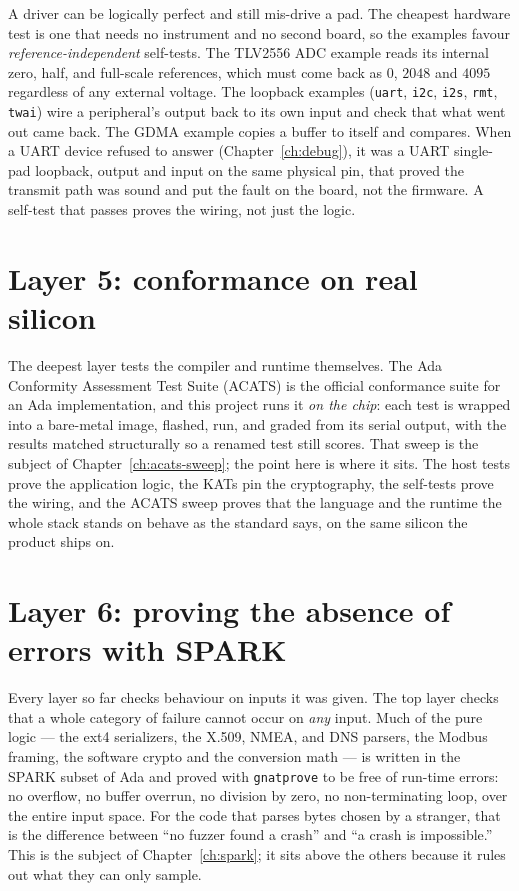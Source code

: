 A driver can be logically perfect and still mis-drive a pad. The cheapest hardware
test is one that needs no instrument and no second board, so the examples favour
\emph{reference-independent} self-tests. The TLV2556 ADC example reads its internal
zero, half, and full-scale references, which must come back as $0$, $2048$ and
$4095$ regardless of any external voltage. The loopback examples (\texttt{uart},
\texttt{i2c}, \texttt{i2s}, \texttt{rmt}, \texttt{twai}) wire a peripheral's output
back to its own input and check that what went out came back. The GDMA example copies
a buffer to itself and compares. When a UART device refused to answer
(Chapter~\ref{ch:debug}), it was a UART single-pad loopback, output and input on the
same physical pin, that proved the transmit path was sound and put the fault on the
board, not the firmware. A self-test that passes proves the wiring, not just the
logic.

\section{Layer 5: conformance on real silicon}

The deepest layer tests the compiler and runtime themselves. The Ada Conformity
Assessment Test Suite (ACATS) is the official conformance suite for an Ada
implementation, and this project runs it \emph{on the chip}: each test is wrapped
into a bare-metal image, flashed, run, and graded from its serial output, with the
results matched structurally so a renamed test still scores. That sweep is the
subject of Chapter~\ref{ch:acats-sweep}; the point here is where it sits. The host
tests prove the application logic, the KATs pin the cryptography, the self-tests
prove the wiring, and the ACATS sweep proves that the language and the runtime the
whole stack stands on behave as the standard says, on the same silicon the product
ships on.

\section{Layer 6: proving the absence of errors with SPARK}

Every layer so far checks behaviour on inputs it was given. The top layer checks that a
whole category of failure cannot occur on \emph{any} input. Much of the pure logic ---
the ext4 serializers, the X.509, NMEA, and DNS parsers, the Modbus framing, the software
crypto and the conversion math --- is written in the SPARK subset of Ada and proved with
\texttt{gnatprove} to be free of run-time errors: no overflow, no buffer overrun, no
division by zero, no non-terminating loop, over the entire input space. For the code that
parses bytes chosen by a stranger, that is the difference between ``no fuzzer found a
crash'' and ``a crash is impossible.'' This is the subject of
Chapter~\ref{ch:spark}; it sits above the others because it rules out what they can only
sample.

